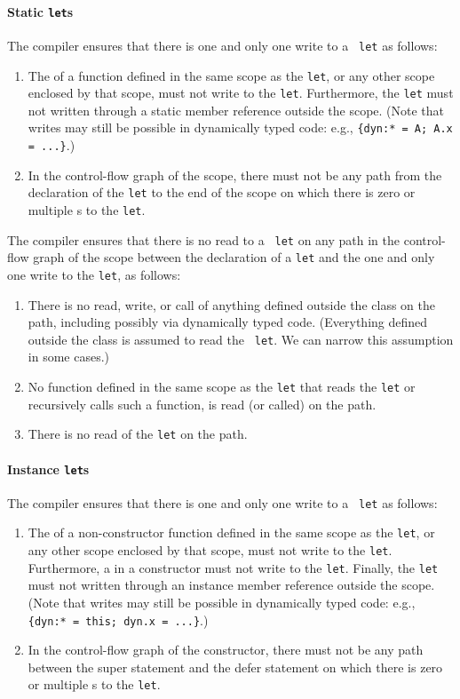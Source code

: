 \paragraph{Static {\tt let}s}

The compiler ensures that there is one and only one write to a {\tt
  let} as follows:
\begin{enumerate}
\item The  of a function defined in the same
  scope as the {\tt let}, or any other scope enclosed by that scope, must not
  write to the {\tt let}. Furthermore, the {\tt let} must not
  written through a static member reference outside the scope.
 (Note that writes may still be
possible in dynamically typed code: e.g.,
\verb#{dyn:* = A; A.x = ...}#.)
\item In the control-flow graph of the scope, there must not be any
  path from the declaration of the {\tt let} to the end of the scope
  on which there is zero or multiple s to the {\tt let}.
\end{enumerate}

The compiler ensures that there is no read to a {\tt
  let} on any path in the control-flow graph of the scope between the
declaration of a {\tt let} and the one and only one write to the {\tt let}, as
follows:
\begin{enumerate}
\item There is no read, write, or call of anything defined outside the
  class on
  the path, including possibly via dynamically typed code. (Everything
  defined outside the class is assumed to read the {\tt
    let}. We can narrow this assumption in some cases.)
\item No function defined in the same scope as the
{\tt let} that reads the {\tt let} or recursively calls such a
function, is read (or called) on the path.
\item There is no read of the {\tt let} on the path.
\end{enumerate}

\paragraph{Instance {\tt let}s}

The compiler ensures that there is one and only one write to a {\tt
  let} as follows:
\begin{enumerate}
\item The  of a non-constructor function defined in the same
  scope as the {\tt let}, or any other scope enclosed by that scope, must not
  write to the {\tt let}. Furthermore, a
   in a constructor must not write to the
  {\tt let}. Finally, the {\tt let} must not
  written through an instance member reference outside the scope.  (Note that writes may still be
possible in dynamically typed code: e.g.,
\verb#{dyn:* = this; dyn.x = ...}#.)
\item In the control-flow graph of the constructor, there must not be any
  path between the super statement and the defer statement
  on which there is zero or multiple s to the {\tt let}.
\end{enumerate}

